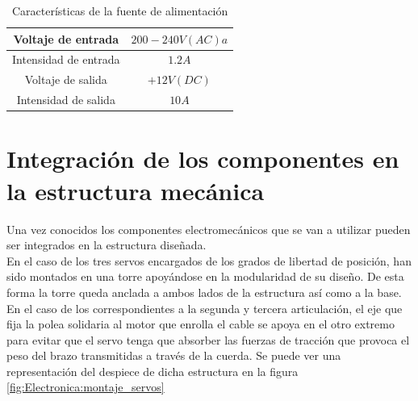 	\begin{table}[H]
      	\caption{Características de la fuente de alimentación}
      	\label{tab:fuente}
      	\begin{center}
      		\begin{tabular}{ |c|c| }
      			\hline
      			Voltaje de entrada & $200-240 V(AC)a$  \\
      			\hline
      			Intensidad de entrada & $1.2A$\\
      			\hline
      			Voltaje de salida & $+12V(DC)$  \\
      			\hline
      			Intensidad de salida & $10A$  \\
      			\hline
      		\end{tabular}
      	\end{center}
	\end{table}

\section{Integración de los componentes en la estructura mecánica} \label{sec:Electronica:Integracion}

    Una vez conocidos los componentes electromecánicos que se van a utilizar pueden ser integrados en la estructura diseñada.
    \\

    En el caso de los tres servos encargados de los grados de libertad de posición, han sido montados en una torre apoyándose en la modularidad de su diseño. De esta forma la torre queda anclada a ambos lados de la estructura así como a la base.
    \\

    En el caso de los correspondientes a la segunda y tercera articulación, el eje que fija la polea solidaria al motor que enrolla el cable se apoya en el otro extremo para evitar que el servo tenga que absorber las fuerzas de tracción que provoca el peso del brazo transmitidas a través de la cuerda. Se puede ver una representación del despiece de dicha estructura en la figura \ref{fig:Electronica:montaje_servos}

